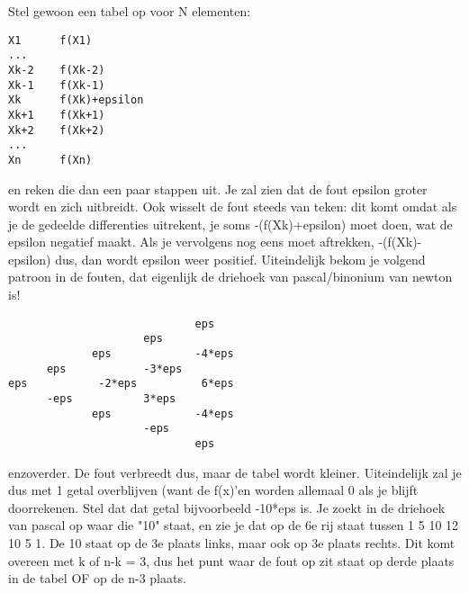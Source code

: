Stel gewoon een tabel op voor N elementen:
\begin{lstlisting}
X1      f(X1)
...
Xk-2    f(Xk-2)
Xk-1    f(Xk-1)
Xk      f(Xk)+epsilon
Xk+1    f(Xk+1)
Xk+2    f(Xk+2)
...
Xn      f(Xn)
\end{lstlisting}
en reken die dan een paar stappen uit. Je zal zien dat de fout epsilon groter wordt en zich uitbreidt. Ook wisselt de fout steeds van teken: dit komt omdat als je de gedeelde differenties uitrekent, je soms -(f(Xk)+epsilon) moet doen, wat de epsilon negatief maakt. Als je vervolgens nog eens moet aftrekken, -(f(Xk)-epsilon) dus, dan wordt epsilon weer positief. Uiteindelijk bekom je volgend patroon in de fouten, dat eigenlijk de driehoek van pascal/binonium van newton is!
\begin{lstlisting}
                             eps
                     eps
             eps             -4*eps
      eps            -3*eps
eps           -2*eps          6*eps
      -eps           3*eps
             eps             -4*eps
                     -eps
                             eps
\end{lstlisting}
enzoverder. De fout verbreedt dus, maar de tabel wordt kleiner. Uiteindelijk zal je dus met 1 getal overblijven (want de f(x)'en worden allemaal 0 als je blijft doorrekenen. Stel dat dat getal bijvoorbeeld -10*eps is. Je zoekt in de driehoek van pascal op waar die "10" staat, en zie je dat op de 6e rij staat tussen 1 5 10 12 10 5 1. De 10 staat op de 3e plaats links, maar ook op 3e plaats rechts. Dit komt overeen met k of n-k = 3, dus het punt waar de fout op zit staat op derde plaats in de tabel OF op de n-3 plaats.